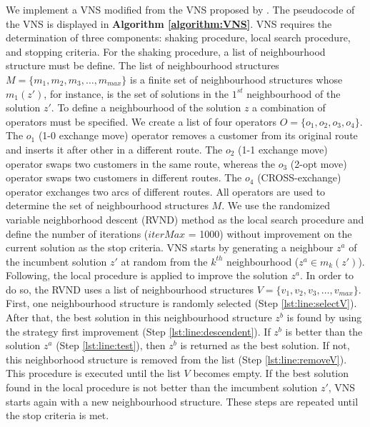 \documentclass[11pt]{article}
\begin{document}
We implement a VNS modified from the VNS proposed by \cite{Mladenovic1997}. The pseudocode of the VNS is displayed in \textbf{Algorithm \ref{algorithm:VNS}}. VNS requires the determination of three components: shaking procedure, local search procedure, and stopping criteria. For the shaking procedure, a list of neighbourhood structure must be define. The list of neighbourhood structures $M = \{m_1, m_2, m_3,\ldots, m_{max}\}$ is a finite set of neighbourhood structures whose $m_1(z')$, for instance, is the set of solutions in the $1^{st}$ neighbourhood of the solution $z'$. To define a neighbourhood of the solution $z$ a combination of operators must be specified. We create a list of four operators $O = \{o_1, o_2, o_3, o_4\}$. The $o_1$ (1-0 exchange move) operator removes a customer from its original route and inserts it after other in a different route. The $o_2$ (1-1 exchange move) operator swaps two customers in the same route, whereas the $o_3$ (2-opt move) operator swaps two customers in different routes. The $o_4$ (CROSS-exchange) \citep{Taillard1997} operator exchanges two arcs of different routes. All operators are used to determine the set of neighbourhood structures $M$. We use the randomized variable neighborhood descent (RVND) method \citep{Hansen1997} as the local search procedure and define the number of iterations ($iterMax$ = 1000) without improvement on the current solution as the stop criteria. VNS starts by generating a neighbour $z^a$ of the incumbent solution $z'$ at random from the $k^{th}$ neighbourhood ($z^a \in m_k(z')$). Following, the local procedure is applied to improve the solution $z^a$. In order to do so, the RVND uses a list of neighbourhood structures $V = \{v_1, v_2, v_3, \ldots , v_{max}\}$. First, one neighbourhood structure is randomly selected (Step \ref{lst:line:selectV}).
After that, the best solution in this neighbourhood structure $z^b$ is found by using the strategy first improvement (Step \ref{lst:line:descendent}). If $z^b$ is better than the solution $z^a$ (Step \ref{lst:line:test}), then $z^b$ is returned as the best solution. If not, this neighborhood structure is removed from the list (Step \ref{lst:line:removeV}). This procedure is executed until the list $V$ becomes empty. If the best solution found in the local procedure is not better than the imcumbent solution $z'$, VNS starts again with a new neighbourhood structure. These steps are repeated until the stop criteria is met.  
\end{document}
